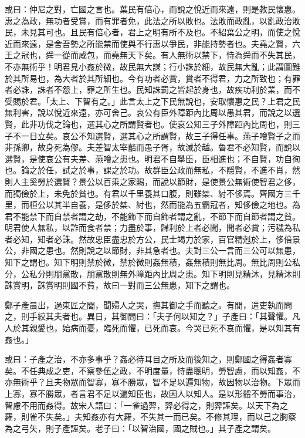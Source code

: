 \begin{pinyinscope}
或曰：仲尼之對，亡國之言也。葉民有倍心，而說之悅近而來遠，則是教民懷惠。惠之為政，無功者受賞，而有罪者免，此法之所以敗也。法敗而政亂，以亂政治敗民，未見其可也。且民有倍心者，君上之明有所不及也。不紹葉公之明，而使之悅近而來遠，是舍吾勢之所能禁而使與不行惠以爭民，非能持勢者也。夫堯之賢，六王之冠也，舜一從而咸包，而堯無天下矣。有人無術以禁下，恃為舜而不失其民，不亦無術乎！明君見小姦於微，故民無大謀；行小誅於細，故民無大亂；此謂圖難於其所易也，為大者於其所細也。今有功者必賞，賞者不得君，力之所致也；有罪者必誅，誅者不怨上，罪之所生也。民知誅罰之皆起於身也，故疾功利於業，而不受賜於君。「太上、下智有之。」此言太上之下民無說也，安取懷惠之民？上君之民無利害，說以悅近來遠，亦可舍己。哀公有臣外障距內比周以愚其君，而說之以選賢，此非功伐之論也，選其心之所謂賢者也。使哀公知三子外障距內比周也，則三子不一日立矣。哀公不知選賢，選其心之所謂賢，故三子得任事。燕子噲賢子之而非孫卿，故身死為僇。夫差智太宰嚭而愚子胥，故滅於越。魯君不必知賢，而說以選賢，是使哀公有夫差、燕噲之患也。明君不自舉臣，臣相進也；不自賢，功自徇也。論之於任，試之於事，課之於功。故群臣公政而無私，不隱賢，不進不肖，然則人主奚勞於選賢？景公以百乘之家賜，而說以節財，是使景公無術使智君之侈，而獨儉於上，未免於貧也。有君以千里養其口腹，則雖桀、紂不侈焉。齊國方三千里，而桓公以其半自養，是侈於桀、紂也，然而能為五霸冠者，知侈儉之地也。為君不能禁下而自禁者謂之劫，不能飾下而自飾者謂之亂，不節下而自節者謂之貧。明君使人無私，以詐而食者禁；力盡於事，歸利於上者必聞，聞者必賞；污穢為私者必知，知者必誅。然故忠臣盡忠於方公，民士竭力於家，百官精剋於上，侈倍景公，非國之患也。然則說之以節財，非其急者也。夫對三公一言而三公可以無患，知下之謂也。知下明則禁於微，禁於微則姦無積，姦無積則無比周。無比周則公私分，公私分則朋黨散，朋黨散則無外障距內比周之患。知下明則見精沐，見精沐則誅賞明，誅賞明則國不貧，故曰一對而三公無患，知下之謂也。


鄭子產晨出，過東匠之閭，聞婦人之哭，撫其御之手而聽之。有閒，遣吏執而問之，則手絞其夫者也。異日，其御問曰：「夫子何以知之？」子產曰：「其聲懼。凡人於其親愛也，始病而憂，臨死而懼，已死而哀。今哭已死不哀而懼，是以知其有姦也。」


或曰：子產之治，不亦多事乎？姦必待耳目之所及而後知之，則鄭國之得姦者寡矣。不任典成之吏，不察參伍之政，不明度量，恃盡聰明，勞智慮，而以知姦，不亦無術乎？且夫物眾而智寡，寡不勝眾，智不足以遍知物，故因物以治物。下眾而上寡，寡不勝眾，者言君不足以遍知臣也，故因人以知人。是以形體不勞而事治，智慮不用而姦得。故宋人語曰：「一雀過羿，羿必得之，則羿誣矣。以天下為之羅，則雀不失矣。」夫知姦亦有大羅，不失其一而已矣。不修其理，而以己之胸察為之弓矢，則子產誣矣。老子曰：「以智治國，國之賊也。」其子產之謂矣。



\end{pinyinscope}
